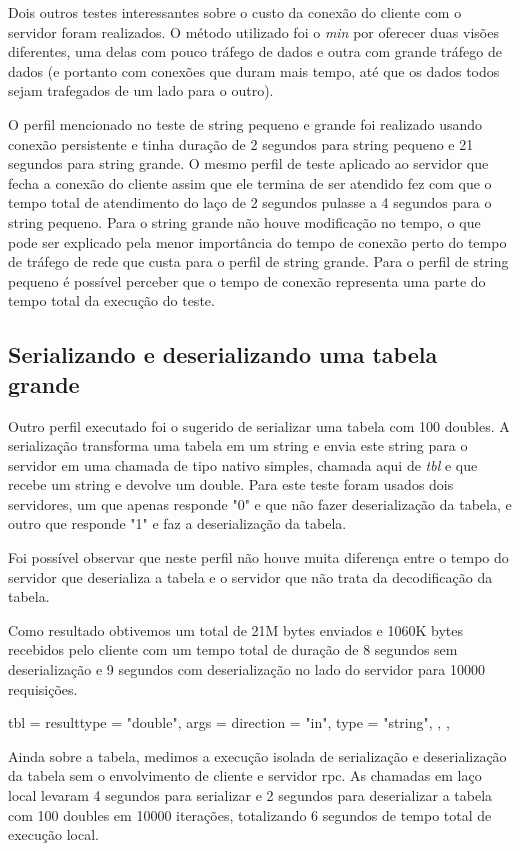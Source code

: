 \documentclass[11pt]{article}
\begin{document}
Dois outros testes interessantes sobre o custo da conexão do cliente com o
servidor foram realizados. O método utilizado foi o \textit{min} por oferecer
duas visões diferentes, uma delas com pouco tráfego de dados e outra com grande
tráfego de dados (e portanto com conexões que duram mais tempo, até que os dados
todos sejam trafegados de um lado para o outro).

O perfil mencionado no teste de string pequeno e grande foi realizado usando
conexão persistente e tinha duração de 2 segundos para string pequeno e 21
segundos para string grande. O mesmo perfil de teste aplicado ao servidor que fecha a conexão do cliente
assim que ele termina de ser atendido fez com que o tempo total de atendimento
do laço de 2 segundos pulasse a 4 segundos para o string pequeno. Para
o string grande não houve modificação no tempo, o que pode ser explicado pela
menor importância do tempo de conexão perto do tempo de tráfego de rede que
custa para o perfil de string grande. Para o perfil de string pequeno é possível
perceber que o tempo de conexão representa uma parte do tempo total da execução
do teste.

\subsection{Serializando e deserializando uma tabela grande}\label{subsec:serdeser}

Outro perfil executado foi o sugerido de serializar uma tabela com 100 doubles.
A serialização transforma uma tabela em um string e envia este string para o
servidor em uma chamada de tipo nativo simples, chamada aqui de \textit{tbl} e
que recebe um string e devolve um double. Para este teste foram usados dois
servidores, um que apenas responde "0" e que não fazer deserialização da tabela,
e outro que responde "1" e faz a deserialização da tabela.

Foi possível observar que neste perfil não houve muita diferença entre o tempo
do servidor que deserializa a tabela e o servidor que não trata da decodificação
da tabela.

Como resultado obtivemos um total de 21M bytes enviados e 1060K bytes recebidos pelo
cliente com um tempo total de duração de 8 segundos sem deserialização e 9
segundos com deserialização no lado do servidor para 10000 requisições.

    tbl = {
      resulttype = "double",
      args = {
        {direction = "in", type = "string"},
      },
    },

Ainda sobre a tabela, medimos a execução isolada de serialização e
deserialização da tabela sem o envolvimento de cliente e servidor \gls{rpc}. As
chamadas em laço local levaram 4 segundos para serializar e 2 segundos para
deserializar a tabela com 100 doubles em 10000 iterações, totalizando 6 segundos
de tempo total de execução local.
\end{document}
